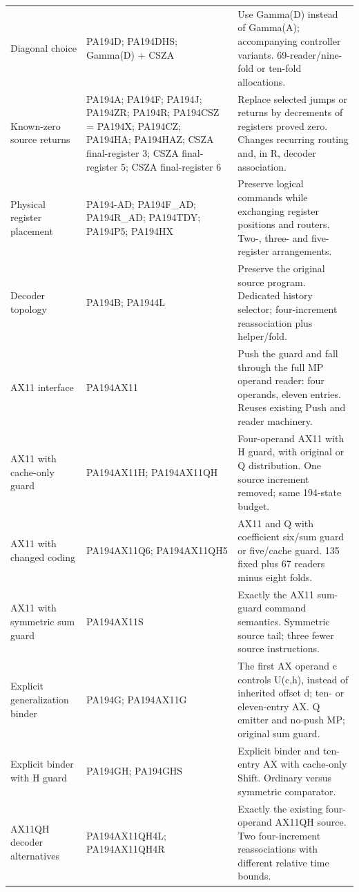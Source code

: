 \begin{longtable}{p{}p{}p{}}
Diagonal choice & PA194D; PA194DHS; Gamma(D) + CSZA & Use Gamma(D) instead of Gamma(A); accompanying controller variants. 69-reader/nine-fold or ten-fold allocations. \\
Known-zero source returns & PA194A; PA194F; PA194J; PA194ZR; PA194R; PA194CSZ = PA194X; PA194CZ; PA194HA; PA194HAZ; CSZA final-register 3; CSZA final-register 5; CSZA final-register 6 & Replace selected jumps or returns by decrements of registers proved zero. Changes recurring routing and, in R, decoder association. \\
Physical register placement & PA194-AD; PA194F\_AD; PA194R\_AD; PA194TDY; PA194P5; PA194HX & Preserve logical commands while exchanging register positions and routers. Two-, three- and five-register arrangements. \\
Decoder topology & PA194B; PA1944L & Preserve the original source program. Dedicated history selector; four-increment reassociation plus helper/fold. \\
AX11 interface & PA194AX11 & Push the guard and fall through the full MP operand reader: four operands, eleven entries. Reuses existing Push and reader machinery. \\
AX11 with cache-only guard & PA194AX11H; PA194AX11QH & Four-operand AX11 with H guard, with original or Q distribution. One source increment removed; same 194-state budget. \\
AX11 with changed coding & PA194AX11Q6; PA194AX11QH5 & AX11 and Q with coefficient six/sum guard or five/cache guard. 135 fixed plus 67 readers minus eight folds. \\
AX11 with symmetric sum guard & PA194AX11S & Exactly the AX11 sum-guard command semantics. Symmetric source tail; three fewer source instructions. \\
Explicit generalization binder & PA194G; PA194AX11G & The first AX operand c controls U(c,h), instead of inherited offset d; ten- or eleven-entry AX. Q emitter and no-push MP; original sum guard. \\
Explicit binder with H guard & PA194GH; PA194GHS & Explicit binder and ten-entry AX with cache-only Shift. Ordinary versus symmetric comparator. \\
AX11QH decoder alternatives & PA194AX11QH4L; PA194AX11QH4R & Exactly the existing four-operand AX11QH source. Two four-increment reassociations with different relative time bounds. \\
\bottomrule
\end{longtable}
